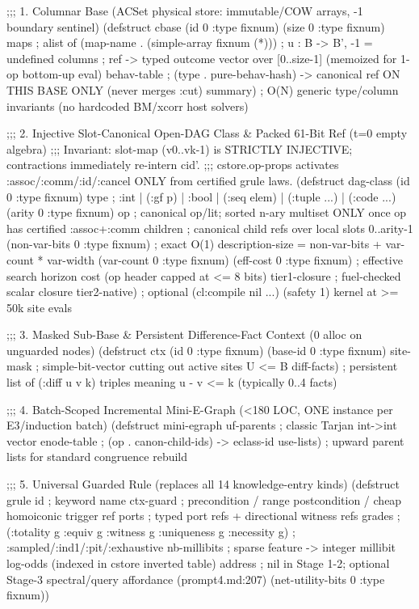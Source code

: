 \documentclass[12pt]{article}
\begin{document}
\begin{CodeBlock}
;;; 1. Columnar Base (ACSet physical store: immutable/COW arrays, -1 boundary sentinel)
(defstruct cbase
  (id 0 :type fixnum)
  (size 0 :type fixnum)
  maps          ; alist of (map-name . (simple-array fixnum (*))) ; u : B -> B', -1 = undefined
  columns       ; ref -> typed outcome vector over [0..size-1] (memoized for 1-op bottom-up eval)
  behav-table   ; (type . pure-behav-hash) -> canonical ref ON THIS BASE ONLY (never merges :cut)
  summary)      ; O(N) generic type/column invariants (no hardcoded BM/xcorr host solvers)

;;; 2. Injective Slot-Canonical Open-DAG Class & Packed 61-Bit Ref (t=0 empty algebra)
;;; Invariant: slot-map (v0..vk-1) is STRICTLY INJECTIVE; contractions immediately re-intern cid'.
;;; cstore.op-props activates :assoc/:comm/:id/:cancel ONLY from certified grule laws.
(defstruct dag-class
  (id 0 :type fixnum)
  type          ; :int | (:gf p) | :bool | (:seq elem) | (:tuple ...) | (:code ...)
  (arity 0 :type fixnum)
  op            ; canonical op/lit; sorted n-ary multiset ONLY once op has certified :assoc+:comm
  children      ; canonical child refs over local slots 0..arity-1
  (non-var-bits 0 :type fixnum) ; exact O(1) description-size = non-var-bits + var-count * var-width
  (var-count 0 :type fixnum)
  (eff-cost 0 :type fixnum)     ; effective search horizon cost (op header capped at <= 8 bits)
  tier1-closure ; fuel-checked scalar closure
  tier2-native) ; optional (cl:compile nil ...) (safety 1) kernel at >= 50k site evals

;;; 3. Masked Sub-Base & Persistent Difference-Fact Context (0 alloc on unguarded nodes)
(defstruct ctx
  (id 0 :type fixnum)
  (base-id 0 :type fixnum)
  site-mask     ; simple-bit-vector cutting out active sites U <= B
  diff-facts)   ; persistent list of (:diff u v k) triples meaning u - v <= k (typically 0..4 facts)

;;; 4. Batch-Scoped Incremental Mini-E-Graph (<180 LOC, ONE instance per E3/induction batch)
(defstruct mini-egraph
  uf-parents    ; classic Tarjan int->int vector
  enode-table   ; (op . canon-child-ids) -> eclass-id
  use-lists)    ; upward parent lists for standard congruence rebuild

;;; 5. Universal Guarded Rule (replaces all 14 knowledge-entry kinds)
(defstruct grule
  id            ; keyword name
  ctx-guard     ; precondition / range postcondition / cheap homoiconic trigger ref
  ports         ; typed port refs + directional witness refs
  grades        ; (:totality g :equiv g :witness g :uniqueness g :necessity g) ; :sampled/:ind1/:pit/:exhaustive
  nb-millibits  ; sparse feature -> integer millibit log-odds (indexed in cstore inverted table)
  address       ; nil in Stage 1-2; optional Stage-3 spectral/query affordance (prompt4.md:207)
  (net-utility-bits 0 :type fixnum))
\end{CodeBlock}
\end{document}
